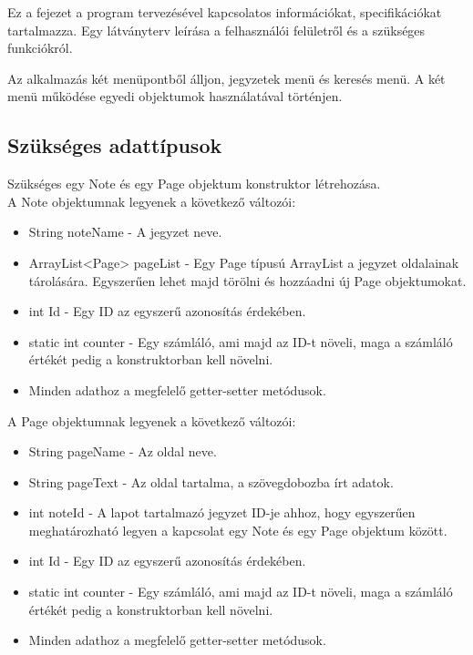 Ez a fejezet a program tervezésével kapcsolatos információkat, specifikációkat tartalmazza. Egy látványterv leírása a felhasználói felületről és a szükséges funkciókról.


Az alkalmazás két menüpontből álljon, jegyzetek menü és keresés menü. A két menü működése egyedi objektumok használatával történjen.

\subsection{Szükséges adattípusok}
Szükséges egy Note és egy Page objektum konstruktor létrehozása.
\\A Note objektumnak legyenek a következő változói:
\begin{itemize}
	\item String noteName - A jegyzet neve.
	\item ArrayList<Page> pageList - Egy Page típusú ArrayList a jegyzet oldalainak tárolására. Egyszerűen lehet majd törölni és hozzáadni új Page objektumokat.
	\item int Id - Egy ID az egyszerű azonosítás érdekében.
	\item static int counter - Egy számláló, ami majd az ID-t növeli, maga a számláló értékét pedig a konstruktorban kell növelni.
	\item Minden adathoz a megfelelő getter-setter metódusok.
\end{itemize}

\vspace{10pt} \noindent A Page objektumnak legyenek a következő változói:
\begin{itemize}
	\item String pageName - Az oldal neve.
	\item String pageText - Az oldal tartalma, a szövegdobozba írt adatok.
	\item int noteId - A lapot tartalmazó jegyzet ID-je ahhoz, hogy egyszerűen meghatározható legyen a kapcsolat egy Note és egy Page objektum között.
	\item int Id - Egy ID az egyszerű azonosítás érdekében.
	\item static int counter - Egy számláló, ami majd az ID-t növeli, maga a számláló értékét pedig a konstruktorban kell növelni.
	\item Minden adathoz a megfelelő getter-setter metódusok.
\end{itemize}

